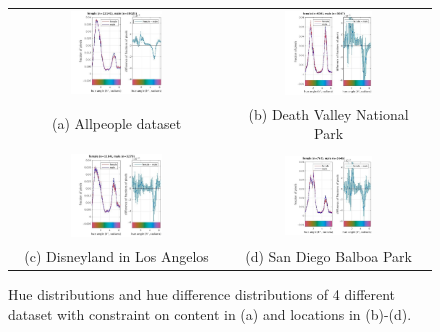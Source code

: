 \begin{figure}[th]
\centering
\begin{tabular}{c c}
\includegraphics[width=0.45\textwidth]{figures/chapter3/allpeoplehuesmall.jpg} &
\includegraphics[width=0.45\textwidth]{figures/chapter3/deathvallyhuesmall.jpg} \\
(a) Allpeople dataset&
(b) Death Valley National Park\\
\\
\includegraphics[width=0.45\textwidth]{figures/chapter3/disneyhuesmall.jpg} &\includegraphics[width=0.45\textwidth]{figures/chapter3/sdzoohuesmall.jpg} \\
(c) Disneyland in Los Angelos&
(d) San Diego Balboa Park\\
\end{tabular}
\caption{Hue distributions and hue difference distributions of 4 different dataset with constraint on content in (a) and locations in (b)-(d).}
\label{fig:allpeople3locations}
\end{figure}

